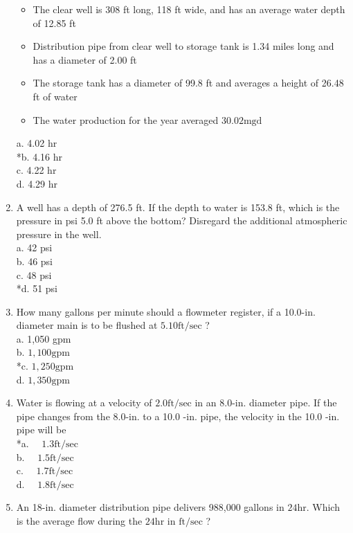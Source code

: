 \begin{enumerate}
\begin{itemize}
\item The clear well is 308 ft long, 118 ft wide, and has an average water depth of 12.85 ft\\
\item Distribution pipe from clear well to storage tank is 1.34 miles long and has a diameter of 2.00 ft\\
\item The storage tank has a diameter of 99.8 ft and averages a height of 26.48 ft of water\\
\item The water production for the year averaged $30.02 \mathrm{mgd}$\\
  \end{itemize}
a. 4.02 hr\\
*b. 4.16 hr\\
c. 4.22 hr\\
d. 4.29 hr\\
\item A well has a depth of 276.5 ft. If the depth to water is 153.8 ft, which is the pressure in psi 5.0 ft above the bottom? Disregard the additional atmospheric pressure in the well.\\
a. 42 psi\\
b. 46 psi\\
c. 48 psi\\
*d. 51 psi\\
\item How many gallons per minute should a flowmeter register, if a 10.0-in. diameter main is to be flushed at $5.10 \mathrm{ft} / \mathrm{sec}$ ?\\
a. 1,050 gpm\\
b. $1,100 \mathrm{gpm}$\\
*c. $1,250 \mathrm{gpm}$\\
d. $1,350 \mathrm{gpm}$\\
\item Water is flowing at a velocity of $2.0 \mathrm{ft} / \mathrm{sec}$ in an 8.0-in. diameter pipe. If the pipe changes from the 8.0-in. to a 10.0 -in. pipe, the velocity in the 10.0 -in. pipe will be\\
*a. $\quad 1.3 \mathrm{ft} / \mathrm{sec}$\\
b. $\quad 1.5 \mathrm{ft} / \mathrm{sec}$\\
c. $\quad 1.7 \mathrm{ft} / \mathrm{sec}$\\
d. $\quad 1.8 \mathrm{ft} / \mathrm{sec}$ \\
\item An 18-in. diameter distribution pipe delivers 988,000 gallons in $24 \mathrm{hr}$. Which is the average flow during the $24 \mathrm{hr}$ in $\mathrm{ft} / \mathrm{sec}$ ?\\

\end{enumerate}
